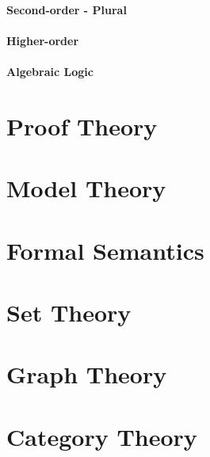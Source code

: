 \documentclass{article}
\begin{document}
\subsection{Second-order - Plural}

\subsection{Higher-order}

\subsection{Algebraic Logic}



\part{Proof Theory}


\part{Model Theory}


\part{Formal Semantics}


\part{Set Theory}


\part{Graph Theory}


\part{Category Theory}

\end{document}
